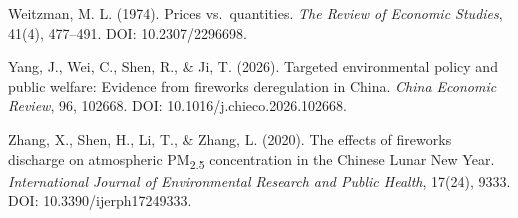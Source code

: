 \begin{list}{}{\setlength{\leftmargin}{2.2em}\setlength{\itemindent}{-2.2em}\setlength{\itemsep}{0.35em}\raggedright\sloppy}
\item Weitzman, M. L. (1974). Prices vs.\ quantities. \emph{The Review of Economic Studies}, 41(4), 477--491. DOI: 10.2307/2296698.
\item Yang, J., Wei, C., Shen, R., \& Ji, T. (2026). Targeted environmental policy and public welfare: Evidence from fireworks deregulation in China. \emph{China Economic Review}, 96, 102668. DOI: 10.1016/j.chieco.2026.102668.
\item Zhang, X., Shen, H., Li, T., \& Zhang, L. (2020). The effects of fireworks discharge on atmospheric PM\textsubscript{2.5} concentration in the Chinese Lunar New Year. \emph{International Journal of Environmental Research and Public Health}, 17(24), 9333. DOI: 10.3390/ijerph17249333.

\end{list}
